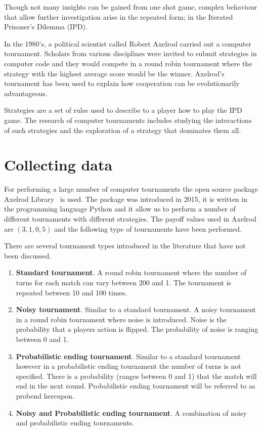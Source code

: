 \documentclass{article}
\begin{document}
Though not many insights can be gained from one shot game, complex behaviour that
allow further investigation arise in the repeated form; in the Iterated Prisoner's
Dilemma (IPD).

In the 1980’s, a political scientist called Robert Axelrod carried out a computer
tournament. Scholars from various disciplines were invited to submit strategies
in computer code and they would compete in a round robin tournament where the
strategy with the highest average score would be the winner. Axelrod’s tournament
has been used to explain how cooperation can be evolutionarily advantageous.

Strategies are a set of rules used to describe to a player how to play the IPD game.
The research of computer tournaments includes studying the interactions of such
strategies and the exploration of a strategy that dominates them all.


\section{Collecting data}

For performing a large number of computer tournaments the open source package
Axelrod Library~\cite{axelrodproject} is used. The package was introduced in 2015,
it is written in the programming language Python and it allow us to perform
a number of different tournaments with different strategies. The payoff values used in
Axelrod are \((3, 1, 0, 5)\) and the following type of tournaments have been performed.

There are several tournament types introduced in the literature that have not been
discussed.

\begin{enumerate}
    \item \textbf{Standard tournament}. A round robin tournament where
    the number of turns for each match can vary between 200 and 1. The tournament
    is repeated between 10 and 100 times.
    \item \textbf{Noisy tournament}. Similar to a standard tournament. A noisy
    tournament in a round robin tournament where noise is introduced. Noise is the
    probability that a players action is flipped. The probability of noise is
    ranging between 0 and 1.
    \item \textbf{Probabilistic ending tournament}. Similar to a standard tournament
    however in a probabilistic ending tournament the number of turns is not specified.
    There is a probability (ranges between 0 and 1) that the match will end in
    the next round. Probabilistic ending tournament will be referred to as
    probend hereupon.
    \item \textbf{Noisy and Probabilistic ending tournament}. A combination of
    noisy and probabilistic ending tournaments.
\end{enumerate}
\end{document}

